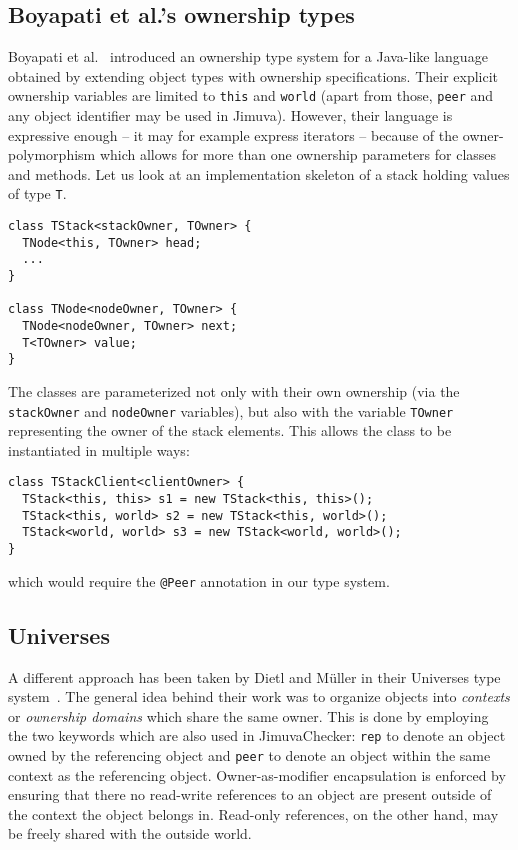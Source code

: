 \documentclass{pracamgr}
\theoremstyle{break}
\theoremstyle{break}
\theoremstyle{break}
\begin{document}
\subsection{Boyapati et al.'s ownership types}

Boyapati et al.~\cite{own-encap} introduced an ownership type system
for a Java-like language obtained by extending object types with
ownership specifications. Their explicit ownership variables are
limited to \texttt{this} and \texttt{world} (apart from those,
\texttt{peer} and any object identifier may be used in
Jimuva). However, their language is expressive enough -- it may for
example express iterators -- because of the owner-polymorphism which
allows for more than one ownership parameters for classes and
methods. Let us look at an implementation skeleton of a stack holding
values of type \texttt{T}.

\begin{lstlisting}
class TStack<stackOwner, TOwner> {
  TNode<this, TOwner> head;
  ...
}

class TNode<nodeOwner, TOwner> {
  TNode<nodeOwner, TOwner> next;
  T<TOwner> value; 
}
\end{lstlisting}

The classes are parameterized not only with their own ownership (via
the \texttt{stackOwner} and \texttt{nodeOwner} variables), but also
with the variable \texttt{TOwner} representing the owner of the stack
elements. This allows the class to be instantiated in multiple ways:
\begin{lstlisting}
class TStackClient<clientOwner> {
  TStack<this, this> s1 = new TStack<this, this>();
  TStack<this, world> s2 = new TStack<this, world>();
  TStack<world, world> s3 = new TStack<world, world>();
}
\end{lstlisting}
which would require the \texttt{@Peer} annotation in our type system. 

\subsection{Universes}

A different approach has been taken by Dietl and Müller in their
Universes type system~\cite{universes}. The general idea behind their
work was to organize objects into \emph{contexts} or \emph{ownership
  domains} which share the same owner. This is done by employing the
two keywords which are also used in JimuvaChecker: \texttt{rep} to
denote an object owned by the referencing object and \texttt{peer} to
denote an object within the same context as the referencing
object. Owner-as-modifier encapsulation is enforced by ensuring that
there no read-write references to an object are present outside of the
context the object belongs in. Read-only references, on the other
hand, may be freely shared with the outside world.
\end{document}
